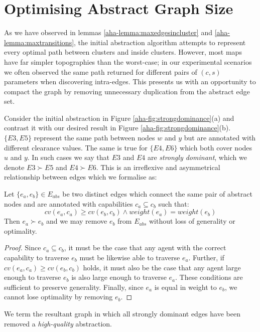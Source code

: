 \section{Optimising Abstract Graph Size}
\par \indent
As we have observed in lemmas \ref{aha-lemma:maxedgesincluster} and \ref{aha-lemma:maxtransitions}, the initial abstraction algorithm attempts to represent every optimal path between clusters and inside clusters.
However, most maps have far simpler topographies than the worst-case; in our  experimental scenarios we often observed the same path returned for different pairs of $(c, s)$ parameters when discovering intra-edges.
This presents us with an opportunity to compact the graph by removing unnecessary duplication from the abstract edge set. 
\par \indent
Consider the initial abstraction in Figure \ref{aha-fig:strongdominance}(a) and contrast it with our desired result in Figure \ref{aha-fig:strongdominance}(b). 
$\lbrace E3, E5 \rbrace$ represent the same path between nodes $w$ and $y$ but are annotated with different clearance values. 
The same is true  for $\lbrace E4, E6 \rbrace$ which both cover nodes $u$ and $y$. 
In such cases we say that $E3$ and $E4$ are \emph{strongly dominant}, which we denote $E3 \succ E5$ and $E4 \succ E6$. 
This is an irreflexive and asymmetrical relationship between edges which we formalise as: 
\begin{theorem}
\label{aha-theorem:strongdominance}
Let $\lbrace e_{a}, e_{b} \rbrace \in E_{abs}$ be two distinct edges which connect the same pair of abstract nodes and are annotated with capabilities $c_{a} \subseteq c_{b}$ such that: 
$$ cv(e_{a}, c_{a}) \geq cv(e_{b}, c_{b}) \wedge weight(e_{a}) = weight(e_{b})$$
Then $e_{a} \succ e_{b}$ and we may remove $e_{b}$ from $E_{abs}$ without loss of generality or optimality.
\end{theorem}
\begin{proof}
Since $c_{a} \subseteq c_{b}$, it must be the case that any agent with the correct capability to traverse $e_{b}$ must be likewise able to traverse $e_{a}$.
Further, if $cv(e_{a}, c_{a}) \geq cv(e_{b}, c_{b})$ holds, it must also be the case that any agent large enough to traverse $e_{b}$ is also large enough to traverse $e_{a}$.
These conditions are sufficient to preserve generality.
Finally, since $e_{a}$ is equal in weight to $e_{b}$, we cannot lose optimality by removing $e_{b}$.
\end{proof}
We term the resultant graph in which all strongly dominant edges have been removed a \emph{high-quality} abstraction.  

